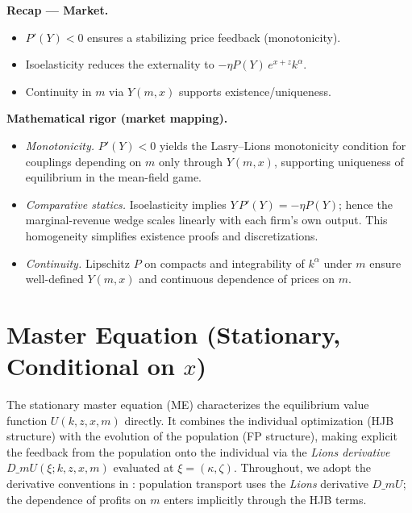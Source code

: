 ﻿\documentclass[11pt,letterpaper,oneside]{article}
\numberwithin{equation}{section}
\newcommand{\1}{\mathbf{1}}
\newcommand{\dmU}{D\_m U}
\newcommand{\Dm}{D\_m}
\begin{document}
\begin{tcolorbox}[didacticstyle]
\textbf{Recap --- Market.}
\begin{itemize}[leftmargin=1.15em,itemsep=0.2em]
  \item $P'(Y)<0$ ensures a stabilizing price feedback (monotonicity).
  \item Isoelasticity reduces the externality to $-\eta P(Y)\,e^{x+z}k^\alpha$.
  \item Continuity in $m$ via $Y(m,x)$ supports existence/uniqueness.
\end{itemize}
\end{tcolorbox}

\begin{tcolorbox}[mathstyle]
\textbf{Mathematical rigor (market mapping).}
\begin{itemize}[leftmargin=1.15em,itemsep=0.25em]
  \item \emph{Monotonicity.} $P'(Y)<0$ yields the Lasry--Lions monotonicity condition for couplings depending on $m$ only through $Y(m,x)$, supporting uniqueness of equilibrium in the mean-field game.
  \item \emph{Comparative statics.} Isoelasticity implies $Y\,P'(Y)=-\eta P(Y)$; hence the marginal-revenue wedge scales linearly with each firm's own output. This homogeneity simplifies existence proofs and discretizations.
  \item \emph{Continuity.} Lipschitz $P$ on compacts and integrability of $k^\alpha$ under $m$ ensure well-defined $Y(m,x)$ and continuous dependence of prices on $m$.
\end{itemize}
\end{tcolorbox}

\section[Master Equation (Stationary, Conditional on x)]{Master Equation (Stationary, Conditional on $x$)}\label{sec:master-equation}
The stationary master equation (ME) characterizes the equilibrium value function $U(k,z,x,m)$ directly. It combines the individual optimization (HJB structure) with the evolution of the population (FP structure), making explicit the feedback from the population onto the individual via the \emph{Lions derivative} $\dmU(\xi;k,z,x,m)$ evaluated at $\xi=(\kappa,\zeta)$. Throughout, we adopt the derivative conventions in : population transport uses the \emph{Lions} derivative $\Dm U$; the dependence of profits on $m$ enters implicitly through the HJB terms.
\end{document}
